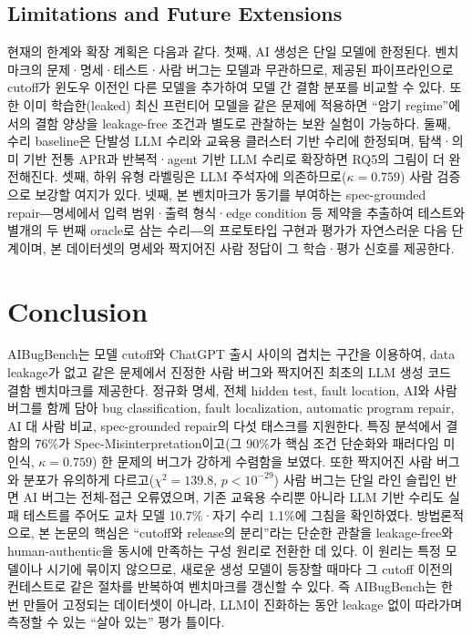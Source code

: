 \documentclass[10pt,conference]{IEEEtran}
\begin{document}
\subsection{Limitations and Future Extensions}
현재의 한계와 확장 계획은 다음과 같다. 첫째, AI 생성은 단일 모델에 한정된다. 벤치마크의 문제·명세·테스트·사람 버그는 모델과 무관하므로, 제공된 파이프라인으로 cutoff가 윈도우 이전인 다른 모델을 추가하여 모델 간 결함 분포를 비교할 수 있다. 또한 이미 학습한(leaked) 최신 프런티어 모델을 같은 문제에 적용하면 ``암기 regime''에서의 결함 양상을 leakage-free 조건과 별도로 관찰하는 보완 실험이 가능하다. 둘째, 수리 baseline은 단발성 LLM 수리와 교육용 클러스터 기반 수리에 한정되며, 탐색·의미 기반 전통 APR과 반복적·agent 기반 LLM 수리로 확장하면 RQ5의 그림이 더 완전해진다. 셋째, 하위 유형 라벨링은 LLM 주석자에 의존하므로($\kappa=0.759$) 사람 검증으로 보강할 여지가 있다. 넷째, 본 벤치마크가 동기를 부여하는 spec-grounded repair―명세에서 입력 범위·출력 형식·edge condition 등 제약을 추출하여 테스트와 별개의 두 번째 oracle로 삼는 수리―의 프로토타입 구현과 평가가 자연스러운 다음 단계이며, 본 데이터셋의 명세와 짝지어진 사람 정답이 그 학습·평가 신호를 제공한다.

\section{Conclusion}
AIBugBench는 모델 cutoff와 ChatGPT 출시 사이의 겹치는 구간을 이용하여, data leakage가 없고 같은 문제에서 진정한 사람 버그와 짝지어진 최초의 LLM 생성 코드 결함 벤치마크를 제공한다. 정규화 명세, 전체 hidden test, fault location, AI와 사람 버그를 함께 담아 bug classification, fault localization, automatic program repair, AI 대 사람 비교, spec-grounded repair의 다섯 태스크를 지원한다. 특징 분석에서 결함의 76\%가 Spec-Misinterpretation이고(그 90\%가 핵심 조건 단순화와 패러다임 미인식, $\kappa=0.759$) 한 문제의 버그가 강하게 수렴함을 보였다. 또한 짝지어진 사람 버그와 분포가 유의하게 다르고($\chi^2=139.8$, $p<10^{-29}$) 사람 버그는 단일 라인 슬립인 반면 AI 버그는 전체-접근 오류였으며, 기존 교육용 수리뿐 아니라 LLM 기반 수리도 실패 테스트를 주어도 교차 모델 10.7\%·자기 수리 1.1\%에 그침을 확인하였다. 방법론적으로, 본 논문의 핵심은 ``cutoff와 release의 분리''라는 단순한 관찰을 leakage-free와 human-authentic을 동시에 만족하는 구성 원리로 전환한 데 있다. 이 원리는 특정 모델이나 시기에 묶이지 않으므로, 새로운 생성 모델이 등장할 때마다 그 cutoff 이전의 컨테스트로 같은 절차를 반복하여 벤치마크를 갱신할 수 있다. 즉 AIBugBench는 한 번 만들어 고정되는 데이터셋이 아니라, LLM이 진화하는 동안 leakage 없이 따라가며 측정할 수 있는 ``살아 있는'' 평가 틀이다.
\end{document}
